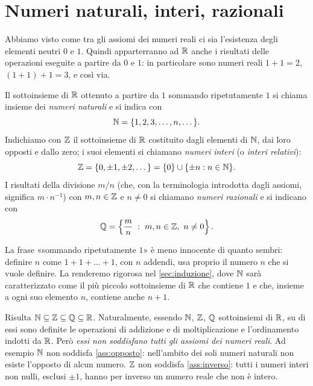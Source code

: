 \section{Numeri naturali, interi, razionali}
\label{sec:nzq}

Abbiamo visto come tra gli assiomi dei numeri reali ci sia l'esistenza degli elementi
neutri $0$ e $1$. Quindi apparterranno ad $\mathbb{R}$ anche i risultati delle operazioni
eseguite a partire da $0$ e $1$: in particolare sono numeri reali $1+1=2$, $(1+1)+1=3$, e
così via.

\begin{definizione}
Il sottoinsieme di $\mathbb{R}$ ottenuto a partire da $1$ sommando ripetutamente $1$ si chiama
insieme dei \emph{numeri naturali} e si indica con
\begin{equation}\label{eq:N}
  \mathbb{N}=\{1,2,3,\dots,n,\dots\}.
\end{equation}
Indichiamo con $\mathbb{Z}$ il sottoinsieme di $\mathbb{R}$ costituito dagli elementi di $\mathbb{N}$, dai loro
opposti e dallo zero; i suoi elementi si chiamano \emph{numeri interi} (o
\emph{interi relativi}):
\begin{equation}\label{eq:Z}
  \mathbb{Z}=\{0,\pm1,\pm2,\dots\}=\{0\}\cup\{\pm n : n\in\mathbb{N}\}.
\end{equation}
I risultati della divisione $m/n$ (che, con la terminologia introdotta dagli assiomi,
significa $m\cdot n^{-1}$) con $m,n\in\mathbb{Z}$ e $n\neq0$ si chiamano \emph{numeri razionali}
e si indicano con
\begin{equation}\label{eq:Q}
  \mathbb{Q}=\left\{ \frac{m}{n} \;:\; m,n\in\mathbb{Z},\ n\neq0 \right\}.
\end{equation}
\end{definizione}

La frase «sommando ripetutamente $1$» è meno innocente di quanto sembri: definire $n$
come $1+1+\dots+1$, con $n$ addendi, usa proprio il numero $n$ che si vuole definire. La
renderemo rigorosa nel \cref{sec:induzione}, dove $\mathbb{N}$ sarà caratterizzato come il più
piccolo sottoinsieme di $\mathbb{R}$ che contiene $1$ e che, insieme a ogni suo elemento $n$,
contiene anche $n+1$.

Risulta $\mathbb{N}\subseteq\mathbb{Z}\subseteq\mathbb{Q}\subseteq\mathbb{R}$. Naturalmente, essendo $\mathbb{N}$, $\mathbb{Z}$, $\mathbb{Q}$
sottoinsiemi di $\mathbb{R}$, su di essi sono definite le operazioni di addizione e di
moltiplicazione e l'ordinamento indotti da $\mathbb{R}$. Però \emph{essi non soddisfano tutti
gli assiomi dei numeri reali}. Ad esempio $\mathbb{N}$ non soddisfa \ref{ass:opposto}:
nell'ambito dei soli numeri naturali non esiste l'opposto di alcun numero. $\mathbb{Z}$ non
soddisfa \ref{ass:inverso}: tutti i numeri interi non nulli, esclusi $\pm1$, hanno per
inverso un numero reale che non è intero.

